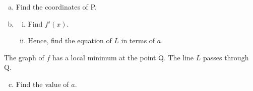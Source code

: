 \documentclass[12pt, twoside]{article}
\begin{document}
\begin{enumerate}
\begin{enumerate}[(a)]
    \item Find the coordinates of P.
    \item \begin{enumerate}[(i)]
        \item Find $f'(x)$.
        \item Hence, find the equation of $L$ in terms of $a$.
    \end{enumerate}
\end{enumerate}

The graph of $f$ has a local minimum at the point Q. The line $L$ passes through Q.

\begin{enumerate}[(a)]
    \setcounter{enumii}{2}
    \item Find the value of $a$.
\end{enumerate}

\end{enumerate}
\end{document}
